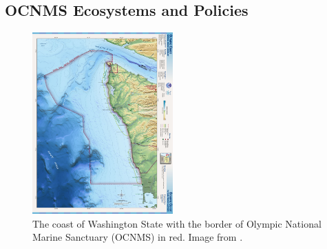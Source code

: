 \documentclass[12pt,twoside]{reedthesis}
\begin{document}
\subsection{OCNMS Ecosystems and Policies}

\begin{figure}
	\begin{center}
		\includegraphics[width=0.48\textwidth]{Fig_OCNMS_Map}
		\caption[Map of OCNMS]{\footnotesize{The coast of Washington State with the border of Olympic National Marine Sanctuary (OCNMS) in red. Image from .}} %
		\label{OCNMSMap}
	\end{center}
\end{figure} 
\end{document}
